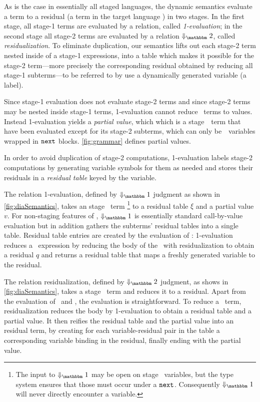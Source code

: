 As is the case in essentially all staged languages, the dynamic
semantics evaluate a term to a residual (a term in the target
language \langTwo) in two stages. In the first stage, all stage-1
terms are evaluated by a relation, called {\em 1-evaluation}; in the
second stage all stage-2 terms are evaluated by a relation
$\redtwosym$, called {\em residualization}.  To eliminate duplication,
our semantics lifts out each stage-2 term nested inside of a stage-1
expressions, into a table which makes it possible for the stage-2
term---more precisely the corresponding residual obtained by reducing
all stage-1 subterms---to be referred to by use a dynamically
generated variable (a label).



Since stage-1 evaluation does not evaluate stage-2 terms and since
stage-2 terms may be nested inside stage-1 terms, 1-evaluation cannot
reduce \lang\ terms to values.  Instead 1-evaluation yields a {\em
  partial value}, which which is a stage~\bbone\ term that have been
evaluated except for its stage-2 subterms, which can only
be~\bbtwo\ variables wrapped in ${\tt next}$ blocks.  \ref{fig:grammar}
defines partial values.

In order to avoid duplication of stage-2 computations, 1-evaluation
labels stage-2 computations by generating variable symbols for them as
needed and stores their residuals in a {\em residual table} keyed by
the variable.

The relation 1-evaluation, defined by $\redonesym$ judgment as shown
in \ref{fig:diaSemantics}, takes an stage \bbone\ term%
\footnote{ The input to $\redonesym$ may be open on stage \bbtwo\ variables, but
the type system ensures that those must occur under a ${\tt next}$. Consequently
$\redonesym$ will never directly encounter a variable.}
%
to a residual table $\xi$ and a partial value $v$.  For non-staging
features of \lang, $\redonesym$ is essentially standard call-by-value
evaluation but in addition gathers the subterms' residual tables into
a single table. Residual table entries are created by the
evaluation of \next: 1-evaluation reduces a \next\ expression by
reducing the body of the \next\ with residualization to obtain a
residual $q$ and returns a residual table that maps a freshly
generated variable to the residual. 

The relation residualization, defined by $\redtwosym$ judgment, as shows
in \ref{fig:diaSemantics}, takes a stage \bbtwo\ term and reduces it to
a residual.  Apart from the evaluation of \prev\ and \pause, the
evaluation is straightforward. To reduce a \prev\ term, residualization
reduces the body by 1-evaluation to obtain a residual table and a
partial value.  It then reifies the residual table and the partial
value into an residual term, by creating for each variable-residual
pair in the table a corresponding variable binding in the residual,
finally ending with the partial value.

